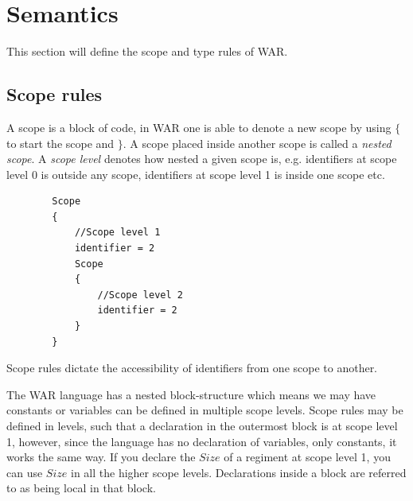 \section{Semantics}
\label{sec:conanal}
This section will define the scope and type rules of WAR.
	\subsection{Scope rules}
		A scope is a block of code, in WAR one is able to denote a new scope by using $\{$ to start the scope and $\}$.
		A scope placed inside another scope is called a {\it nested scope}. A {\it scope level} denotes how nested a given scope is,
		e.g. identifiers at scope level 0 is outside any scope, identifiers at scope level 1 is inside one scope etc.
		\begin{lstlisting}
		Scope
		{
			//Scope level 1
			identifier = 2
			Scope
			{
				//Scope level 2
				identifier = 2
			}
		}
		\end{lstlisting}
		
		Scope rules dictate the accessibility of identifiers from one scope to another.
	
	The WAR language has a nested block-structure which means we may have constants or variables can be defined in multiple scope levels. 
	Scope rules may be defined in levels, such that a declaration in the outermost block is at scope level 1, however, since the language has no declaration of variables, only constants, it works the same way. If you declare the $Size$ of a regiment at scope level 1, you can use $Size$ in all the higher scope levels. Declarations inside a block are referred to as being local in that block.

